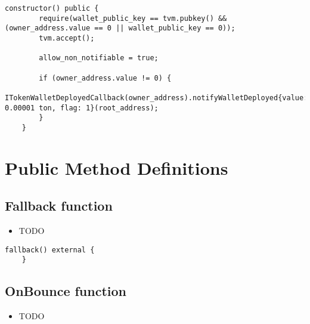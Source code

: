 \begin{lstlisting}[firstnumber=43]
    constructor() public {
        require(wallet_public_key == tvm.pubkey() && (owner_address.value == 0 || wallet_public_key == 0));
        tvm.accept();

        allow_non_notifiable = true;

        if (owner_address.value != 0) {
            ITokenWalletDeployedCallback(owner_address).notifyWalletDeployed{value: 0.00001 ton, flag: 1}(root_address);
        }
    }
\end{lstlisting}

\section{Public Method Definitions}


\subsection{Fallback function}

\noindent\begin{itemize}
\item TODO
\end{itemize}

\begin{lstlisting}[firstnumber=683]
    fallback() external {
    }
\end{lstlisting}

\subsection{OnBounce function}

\noindent\begin{itemize}
\item TODO
\end{itemize}

